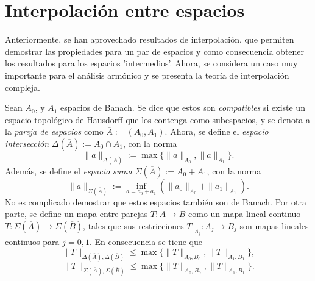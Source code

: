 \section{Interpolación entre espacios}
Anteriormente, se han aprovechado resultados de interpolación, que permiten demostrar las propiedades para un par de espacios y como consecuencia obtener los resultados para los espacios 'intermedios'. Ahora, se considera un caso muy importante para el análisis armónico y se presenta la teoría de interpolación compleja.
\begin{definition}
	Sean $A_0$, y $A_1$ espacios de Banach. Se dice que estos son \textit{compatibles} si existe un espacio topológico de Hausdorff que los contenga como subespacios, y se denota a la \textit{pareja de espacios} como $\overline{A}:=(A_0, A_1)$. Ahora, se define el \textit{espacio intersección} $\Delta(\overline{A}):=A_0\cap A_1$, con la norma 
	\begin{equation*}
		\|a\|_{\Delta(\overline{A})} := \max \{\|a\|_{A_0}, \|a\|_{A_1}\}.
	\end{equation*} 
	Además, se define el \textit{espacio suma} $\Sigma(\overline{A}):=A_0+A_1$, con la norma
	\begin{equation*}
		\|a\|_{\Sigma(\overline{A})} := \inf_{a=a_0+a_1} (\|a_0\|_{A_0}+\|a_1\|_{A_1}).
	\end{equation*}
	No es complicado demostrar que estos espacios también son de Banach. Por otra parte, se define un mapa entre parejas $T:\overline{A}\to\overline{B}$ como un mapa lineal continuo $T:\Sigma(\overline{A})\to\Sigma(\overline{B})$, tales que sus restricciones  $T|_{A_j}:A_j\to B_j$ son mapas lineales continuos para $j=0,1$. En consecuencia se tiene que 
	\begin{equation*}
		\|T\|_{\Delta(\overline{A}), \Delta(\overline{B})} \leq \max\{\|T\|_{A_0, B_0}, \|T\|_{A_1, B_1}\},
	\end{equation*}
	\begin{equation*}
		\|T\|_{\Sigma(\overline{A}), \Sigma(\overline{B})} \leq \max\{\|T\|_{A_0, B_0}, \|T\|_{A_1, B_1}\}.
	\end{equation*}
\end{definition}
